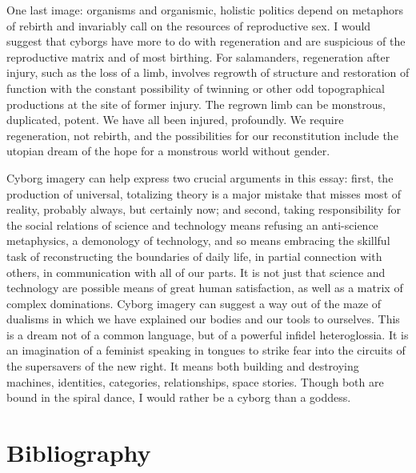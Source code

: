 \documentclass[DIV=12,%
               BCOR=10mm,%
               headinclude=false,%
               footinclude=false,open=any,%
               fontsize=11pt,%
               twoside,%
               paper=210mm:11in]%
               {scrbook}
\begin{document}
One last image: organisms and organismic, holistic politics depend on metaphors of rebirth and invariably call on the resources of reproductive sex. I would suggest that cyborgs have more to do with regeneration and are suspicious of the reproductive matrix and of most birthing. For salamanders, regeneration after injury, such as the loss of a limb, involves regrowth of structure and restoration of function with the constant possibility of twinning or other odd topographical productions at the site of former injury. The regrown limb can be monstrous, duplicated, potent. We have all been injured, profoundly. We require regeneration, not rebirth, and the possibilities for our reconstitution include the utopian dream of the hope for a monstrous world without gender.


Cyborg imagery can help express two crucial arguments in this essay: first, the production of universal, totalizing theory is a major mistake that misses most of reality, probably always, but certainly now; and second, taking responsibility for the social relations of science and technology means refusing an anti-science metaphysics, a demonology of technology, and so means embracing the skillful task of reconstructing the boundaries of daily life, in partial connection with others, in communication with all of our parts. It is not just that science and technology are possible means of great human satisfaction, as well as a matrix of complex dominations. Cyborg imagery can suggest a way out of the maze of dualisms in which we have explained our bodies and our tools to ourselves. This is a dream not of a common language, but of a powerful infidel heteroglossia. It is an imagination of a feminist speaking in tongues to strike fear into the circuits of the supersavers of the new right. It means both building and destroying machines, identities, categories, relationships, space stories. Though both are bound in the spiral dance, I would rather be a cyborg than a goddess.

\chapter{Bibliography}
\end{document}
